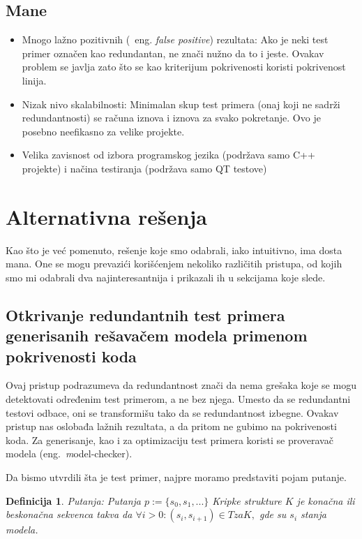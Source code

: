 \documentclass[a4paper]{article}
\newtheorem{definition}{Definicija}[section]
\begin{document}
\subsection{Mane}
\label{subsec:mane}
\begin{itemize}
    \item Mnogo lažno pozitivnih (~eng. \textit{false positive}) rezultata: Ako je neki test primer označen kao redundantan, ne znači nužno da to i jeste. Ovakav problem se javlja zato što se kao kriterijum pokrivenosti koristi pokrivenost linija.
    \item Nizak nivo skalabilnosti: Minimalan skup test primera (onaj koji ne sadrži redundantnosti) se računa iznova i iznova za svako pokretanje. Ovo je posebno neefikasno za velike projekte.
    \item Velika zavisnost od izbora programskog jezika (podržava samo C++ projekte) i načina testiranja (podržava samo QT testove) 
\end{itemize}


\section{Alternativna rešenja}
\label{sec:alternative}

Kao što je već pomenuto, rešenje koje smo odabrali, iako intuitivno, ima dosta mana. One se mogu prevazići korišćenjem nekoliko različitih pristupa, od kojih smo mi odabrali dva najinteresantnija i prikazali ih u sekcijama koje slede.

\subsection{Otkrivanje redundantnih test primera generisanih rešavačem modela primenom pokrivenosti koda}
\label{subsec:prvi}

Ovaj pristup\cite{prvinacin} podrazumeva da redundantnost znači da nema grešaka koje se mogu detektovati određenim test primerom, a ne bez njega. Umesto da se redundantni testovi odbace, oni se transformišu tako da se redundantnost izbegne. Ovakav pristup nas oslobađa lažnih rezultata, a da pritom ne gubimo na pokrivenosti koda. Za generisanje, kao i za optimizaciju test primera koristi se proveravač modela (eng.~{\textit model-checker}).

Da bismo utvrdili šta je test primer, najpre moramo predstaviti pojam putanje.

\begin{definition}{Putanja:}
Putanja $ p := \{s_0, s_1, ...\}$ Kripke strukture $K$ je konačna ili beskonačna sekvenca takva da $ \forall i > 0 : (s_i, s_{i+1}) \in T za K, $ gde su $ s_i $ stanja modela.
\end{definition}
\end{document}
